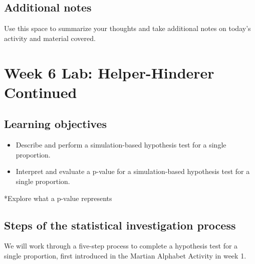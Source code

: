 \documentclass[
]{report}
\begin{document}
\hypertarget{additional-notes-8}{%
\subsection{Additional notes}\label{additional-notes-8}}

Use this space to summarize your thoughts and take additional notes on today's activity and material covered.

\newpage

\hypertarget{week-6-lab-helper-hinderer-continued}{%
\section{Week 6 Lab: Helper-Hinderer Continued}\label{week-6-lab-helper-hinderer-continued}}


\hypertarget{learning-objectives-6}{%
\subsection{Learning objectives}\label{learning-objectives-6}}

\begin{itemize}
\item
  Describe and perform a simulation-based hypothesis test for a single proportion.
\item
  Interpret and evaluate a p-value for a simulation-based hypothesis test for a single proportion.
\end{itemize}

*Explore what a p-value represents

\hypertarget{steps-of-the-statistical-investigation-process-2}{%
\subsection{Steps of the statistical investigation process}\label{steps-of-the-statistical-investigation-process-2}}

We will work through a five-step process to complete a hypothesis test for a single proportion, first introduced in the Martian Alphabet Activity in week 1.
\end{document}
